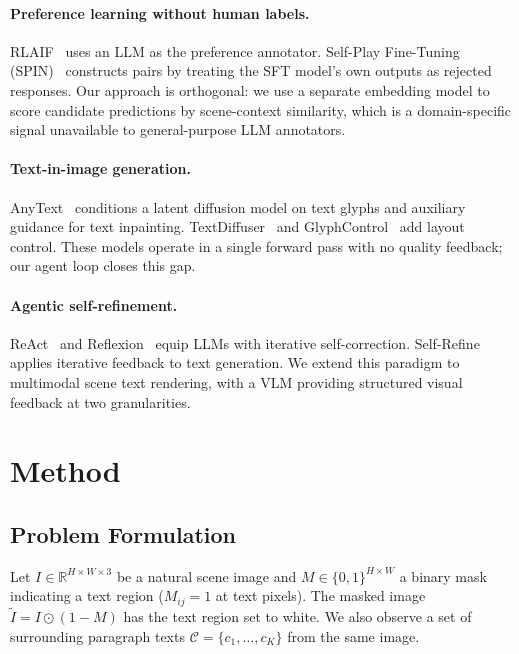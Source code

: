 \documentclass[uplatex,10pt,twocolumn,a4paper]{article}
\begin{document}
\paragraph{Preference learning without human labels.}
RLAIF~\cite{rlaif2023} uses an LLM as the preference annotator.
Self-Play Fine-Tuning (SPIN)~\cite{spin2024} constructs pairs by
treating the SFT model's own outputs as rejected responses.
Our approach is orthogonal: we use a separate embedding model to score
candidate predictions by scene-context similarity, which is a
domain-specific signal unavailable to general-purpose LLM annotators.

\paragraph{Text-in-image generation.}
AnyText~\cite{anytext2023} conditions a latent diffusion model on text
glyphs and auxiliary guidance for text inpainting.
TextDiffuser~\cite{textdiffuser2023} and
GlyphControl~\cite{glyphcontrol2023} add layout control.
These models operate in a single forward pass with no quality feedback;
our agent loop closes this gap.

\paragraph{Agentic self-refinement.}
ReAct~\cite{react2022} and Reflexion~\cite{reflexion2023} equip LLMs
with iterative self-correction.
Self-Refine~\cite{selfrefine2023} applies iterative feedback to text
generation.
We extend this paradigm to multimodal scene text rendering, with a
VLM providing structured visual feedback at two granularities.

\section{Method}
\label{sec:method}

\subsection{Problem Formulation}
\label{sec:problem}

Let $I \in \mathbb{R}^{H \times W \times 3}$ be a natural scene image
and $M \in \{0,1\}^{H \times W}$ a binary mask indicating a text
region ($M_{ij}=1$ at text pixels).
The masked image $\tilde{I} = I \odot (1 - M)$ has the text region
set to white.
We also observe a set of surrounding paragraph texts
$\mathcal{C} = \{c_1, \ldots, c_K\}$ from the same image.
\end{document}
